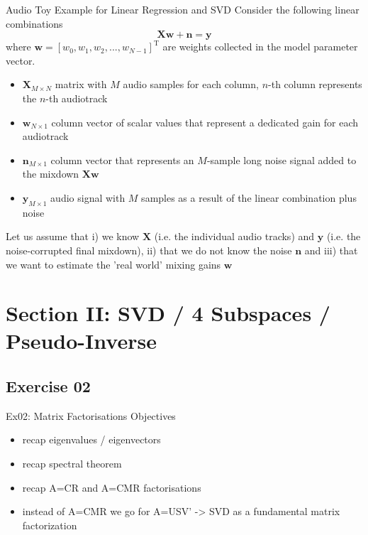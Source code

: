 \documentclass[mathserif, aspectratio=1610]{intbeamer}
\begin{document}
\begin{frame}{Audio Toy Example for Linear Regression and SVD}
Consider the following linear combinations
$$\bm{X} \bm{w} + \bm{n} = \bm{y}$$
where $\bm{w}=[w_0, w_1, w_2, ..., w_{N-1}]^\mathrm{T}$ are weights collected in the model parameter vector.
%
\begin{itemize}
\item $\bm{X}_{M \times N}$ matrix with $M$ audio samples for each column, $n$-th column represents the $n$-th audiotrack
\item $\bm{w}_{N \times 1}$ column vector of scalar values that represent a dedicated gain for each audiotrack
\item $\bm{n}_{M \times 1}$ column vector that represents an $M$-sample long noise signal added to the mixdown $\bm{X} \bm{w}$
\item $\bm{y}_{M \times 1}$ audio signal with $M$ samples as a result of the linear combination plus noise
\end{itemize}
%
Let us assume that i) we know $\bm{X}$ (i.e. the individual audio tracks) and $\bm{y}$ (i.e. the noise-corrupted final mixdown), ii) that we do not know the noise $\bm{n}$ and iii) that we want to estimate the 'real world' mixing gains $\bm{w}$
\end{frame}


\section{Section II: SVD / 4 Subspaces / Pseudo-Inverse}

\subsection{Exercise 02}
\begin{frame}{Ex02: Matrix Factorisations}
Objectives
\begin{itemize}
\item recap eigenvalues / eigenvectors
\item recap spectral theorem
\item recap A=CR and A=CMR factorisations
\item instead of A=CMR we go for A=USV' -> SVD as a fundamental matrix factorization
\end{itemize}
\end{frame}
\end{document}
